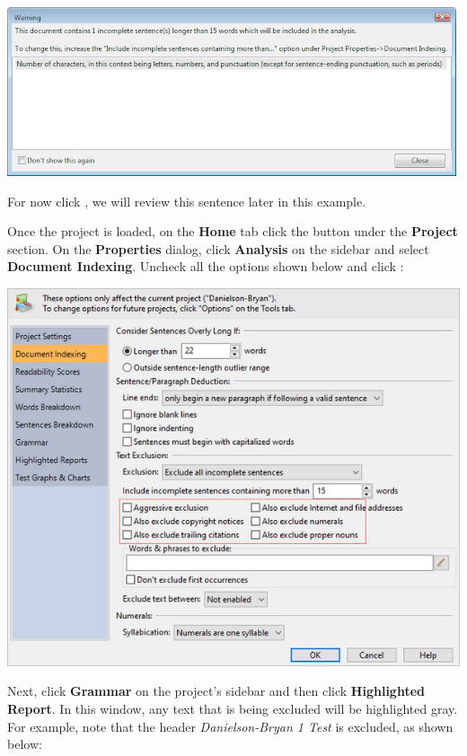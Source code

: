 \documentclass[
]{book}
\theoremstyle{definition}
\theoremstyle{definition}
\theoremstyle{definition}
\theoremstyle{definition}
\theoremstyle{remark}
\begin{document}
\includegraphics{Images/NonGenerated/ExclusionExampleIncompleteSentWarning.png}

For now click , we will review this sentence later in this example.

Once the project is loaded, on the \textbf{Home} tab click the  button under the \textbf{Project} section. On the \textbf{Properties} dialog, click \textbf{Analysis} on the sidebar and select \textbf{Document Indexing}. Uncheck all the options shown below and click :

\includegraphics{Images/ExclusionExampleAllExcluded.png}

Next, click \textbf{Grammar} on the project's sidebar and then click \textbf{Highlighted Report}. In this window, any text that is being excluded will be highlighted gray. For example, note that the header \emph{Danielson-Bryan 1 Test} is excluded, as shown below:
\end{document}
